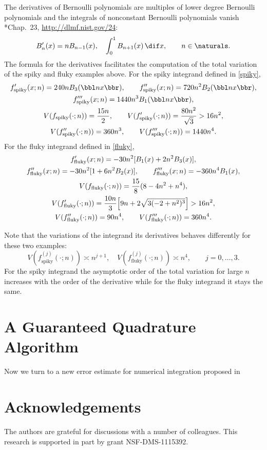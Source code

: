 \documentclass[]{amsart}
\theoremstyle{definition}
\theoremstyle{remark}
\begin{document}
The derivatives of Bernoulli polynomials are multiples of lower degree Bernoulli polynomials and the integrals of nonconstant Bernoulli polynomials vanish \cite{AbrSte64}*{Chap.\ 23, \url{http://dlmf.nist.gov/24}}:
\[
B'_n(x) = n B_{n-1}(x), \quad \int_0^1 B_{n+1}(x) \, \dif x, \qquad n \in \naturals.
\]
The formula for the derivatives facilitates the computation of the total variation of the spiky and fluky examples above.  For the spiky integrand defined in \eqref{spiky},
\begin{subequations} \label{spikyvariation}
\begin{gather}
f'_{\text{spiky}}(x;n) = 240 n B_3(\bbl nx \bbr), \qquad f''_{\text{spiky}}(x;n) = 720 n^2 B_2(\bbl nx \bbr), \\ f'''_{\text{spiky}}(x;n) = 1440 n^3 B_1(\bbl nx \bbr), \\
V(f_{\text{spiky}}(\cdot;n))= \frac{15n}{2}, \qquad  V(f'_{\text{spiky}}(\cdot;n))= \frac{80n^2}{\sqrt{3}} > 16 n^2, \\
V(f''_{\text{spiky}}(\cdot;n))= 360n^3, \qquad V(f'''_{\text{spiky}}(\cdot;n))= 1440n^4.
\end{gather}
\end{subequations} 
For the fluky integrand defined in \eqref{fluky},
\begin{subequations} \label{spikyvariation}
\begin{gather}
f'_{\text{fluky}}(x;n) = - 30 n^2 [B_1(x) + 2 n^2 B_3(x)], \\ f''_{\text{fluky}}(x;n) = -30 n^2 [1 + 6 n^2 B_2(x)], \qquad f'''_{\text{fluky}}(x;n) = -360 n^4 B_1(x), \\
V(f_{\text{fluky}}(\cdot;n))= \frac{15}{8} (8 - 4 n^2 + n^4),  \\
V(f'_{\text{fluky}}(\cdot;n))= \frac{10 n}{3}  \Bigl[9 n + 2 \sqrt{3(-2 + n^2)^3} \Bigr ]  > 16 n^2, \\
V(f''_{\text{fluky}}(\cdot;n))= 90n^4, \qquad V(f'''_{\text{fluky}}(\cdot;n))= 360n^4.
\end{gather}
\end{subequations}  

Note that the variations of the integrand its derivatives behaves differently for these two examples:
\[
V(f^{(j)}_{\text{spiky}}(\cdot;n)) \asymp n^{j+1}, \quad V(f^{(j)}_{\text{fluky}}(\cdot;n)) \asymp n^{4}, \qquad j=0, \ldots, 3.
\]
For the spiky integrand the asymptotic order of the total variation for large $n$ increases with the order of the derivative while for the fluky integrand it stays the same.

\section{A Guaranteed Quadrature Algorithm} \label{newalgosec}

Now we turn to a new error estimate for numerical integration proposed in 

\section{Acknowledgements}  The authors are grateful for discussions with a number of colleagues. This research is supported in part by grant NSF-DMS-1115392.


\end{document}
